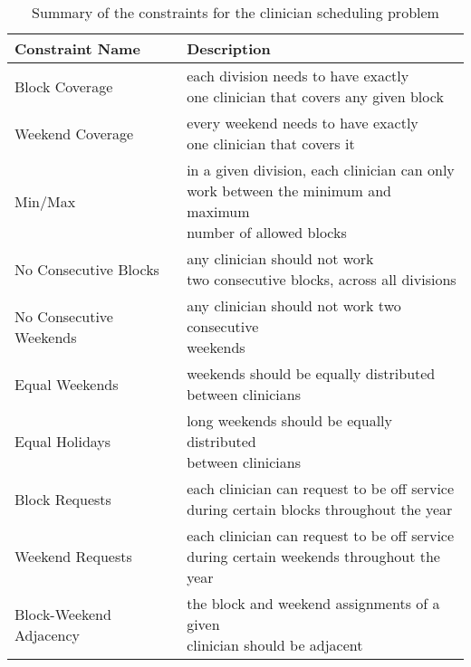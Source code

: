 \begin{table}[h]
	\centering
	\begin{tabular}{ l l }
		\hline
		\textbf{Constraint Name} & \textbf{Description}                                                                                                           \\ \hline
		Block Coverage           & \makecell[l]{each division needs to have exactly \\ one clinician that covers any given block}                                 \\ \hline
		Weekend Coverage         & \makecell[l]{every weekend needs to have exactly \\ one clinician that covers it}                                              \\ \hline
		Min/Max                  & \makecell[l]{in a given division, each clinician can only \\ work between the minimum and maximum \\ number of allowed blocks} \\ \hline
		No Consecutive Blocks    & \makecell[l]{any clinician should not work \\ two consecutive blocks, across all divisions}                                    \\ \hline
		No Consecutive Weekends  & \makecell[l]{any clinician should not work two consecutive \\ weekends}                                                        \\ \hline
		Equal Weekends           & \makecell[l]{weekends should be equally distributed \\ between clinicians}                                                     \\ \hline
		Equal Holidays           & \makecell[l]{long weekends should be equally distributed \\ between clinicians}                                                \\ \hline
		Block Requests           & \makecell[l]{each clinician can request to be off service \\ during certain blocks throughout the year}                        \\ \hline
		Weekend Requests         & \makecell[l]{each clinician can request to be off service \\ during certain weekends throughout the year}                      \\ \hline
		Block-Weekend Adjacency  & \makecell[l]{the block and weekend assignments of a given \\ clinician should be adjacent}
	\end{tabular}
	\caption{Summary of the constraints for the clinician scheduling problem}
	\label{tbl:constraint-summary}
\end{table}

